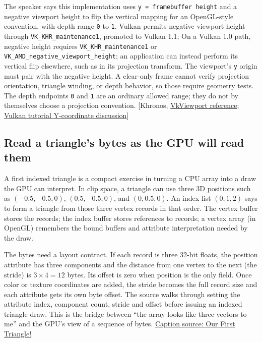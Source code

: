 The speaker says this implementation uses \texttt{y\ =\ framebuffer\ height} and a negative viewport height to flip the vertical mapping for an OpenGL-style convention, with depth range \texttt{0} to \texttt{1}. Vulkan permits negative viewport height through \texttt{VK\_KHR\_maintenance1}, promoted to Vulkan 1.1; On a Vulkan 1.0 path, negative height requires \texttt{VK\_KHR\_maintenance1} or \texttt{VK\_AMD\_negative\_viewport\_height}; an application can instead perform its vertical flip elsewhere, such as in its projection transform. The viewport's \texttt{y} origin must pair with the negative height. A clear-only frame cannot verify projection orientation, triangle winding, or depth behavior, so those require geometry tests. The depth endpoints \texttt{0} and \texttt{1} are an ordinary allowed range; they do not by themselves choose a projection convention. {[}Khronos, \href{https://docs.vulkan.org/refpages/latest/refpages/source/VkViewport.html}{VkViewport reference}; \href{https://docs.vulkan.org/tutorial/latest/05_Uniform_buffers/00_Descriptor_set_layout_and_buffer.html}{Vulkan tutorial Y-coordinate discussion}{]}

\subsection{Read a triangle's bytes as the GPU will read them}\label{06-engine-ii-ch025-read-a-triangles-bytes-as-the-gpu-will-read-them}

A first indexed triangle is a compact exercise in turning a CPU array into a draw the GPU can interpret. In clip space, a triangle can use three 3D positions such as \((-0.5,-0.5,0)\), \((0.5,-0.5,0)\), and \((0,0.5,0)\). An index list \((0,1,2)\) says to form a triangle from those three vertex records in that order. The vertex buffer stores the records; the index buffer stores references to records; a vertex array (in OpenGL) remembers the bound buffers and attribute interpretation needed by the draw.

The bytes need a layout contract. If each record is three 32-bit floats, the position attribute has three components and the distance from one vertex to the next (the stride) is \(3\times4=12\) bytes. Its offset is zero when position is the only field. Once color or texture coordinates are added, the stride becomes the full record size and each attribute gets its own byte offset. The source walks through setting the attribute index, component count, stride and offset before issuing an indexed triangle draw. This is the bridge between ``the array looks like three vectors to me'' and the GPU's view of a sequence of bytes. \href{https://www.youtube.com/watch?v=bwFYXo0VgCc}{Caption source: Our First Triangle!}

